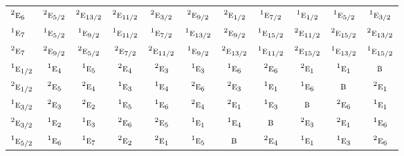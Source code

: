 \documentclass[10pt,a4paper]{article}
\numberwithin{equation}{section}
\newcommand{\irr}[1]{\text{\normalfont\scshape #1}}
\newcommand{\conjpair}[1]{{}^{#1}}
\begin{document}
{\begin{longtable}{@{}lcccccccccc@{}}
$\conjpair{2}\irr{e}_{6}$ & $\conjpair{2}\irr{e}_{5/2}$ & $\conjpair{2}\irr{e}_{13/2}$ & $\conjpair{2}\irr{e}_{11/2}$ & $\conjpair{2}\irr{e}_{3/2}$ & $\conjpair{2}\irr{e}_{9/2}$ & $\conjpair{2}\irr{e}_{1/2}$ & $\conjpair{1}\irr{e}_{7/2}$ & $\conjpair{1}\irr{e}_{1/2}$ & $\conjpair{1}\irr{e}_{5/2}$ & $\conjpair{1}\irr{e}_{3/2}$\\
$\conjpair{1}\irr{e}_{7}$ & $\conjpair{1}\irr{e}_{5/2}$ & $\conjpair{1}\irr{e}_{9/2}$ & $\conjpair{1}\irr{e}_{11/2}$ & $\conjpair{1}\irr{e}_{7/2}$ & $\conjpair{1}\irr{e}_{13/2}$ & $\conjpair{2}\irr{e}_{9/2}$ & $\conjpair{1}\irr{e}_{15/2}$ & $\conjpair{2}\irr{e}_{11/2}$ & $\conjpair{2}\irr{e}_{15/2}$ & $\conjpair{2}\irr{e}_{13/2}$\\
$\conjpair{2}\irr{e}_{7}$ & $\conjpair{2}\irr{e}_{9/2}$ & $\conjpair{2}\irr{e}_{5/2}$ & $\conjpair{2}\irr{e}_{7/2}$ & $\conjpair{2}\irr{e}_{11/2}$ & $\conjpair{1}\irr{e}_{9/2}$ & $\conjpair{2}\irr{e}_{13/2}$ & $\conjpair{1}\irr{e}_{11/2}$ & $\conjpair{2}\irr{e}_{15/2}$ & $\conjpair{1}\irr{e}_{13/2}$ & $\conjpair{1}\irr{e}_{15/2}$\\
$\conjpair{1}\irr{e}_{1/2}$ & $\conjpair{1}\irr{e}_{4}$ & $\conjpair{1}\irr{e}_{5}$ & $\conjpair{2}\irr{e}_{4}$ & $\conjpair{2}\irr{e}_{3}$ & $\conjpair{1}\irr{e}_{3}$ & $\conjpair{1}\irr{e}_{6}$ & $\conjpair{2}\irr{e}_{6}$ & $\conjpair{2}\irr{e}_{1}$ & $\conjpair{1}\irr{e}_{1}$ & $\irr{b}$\\
$\conjpair{2}\irr{e}_{1/2}$ & $\conjpair{2}\irr{e}_{5}$ & $\conjpair{2}\irr{e}_{4}$ & $\conjpair{1}\irr{e}_{3}$ & $\conjpair{1}\irr{e}_{4}$ & $\conjpair{2}\irr{e}_{6}$ & $\conjpair{2}\irr{e}_{3}$ & $\conjpair{1}\irr{e}_{1}$ & $\conjpair{1}\irr{e}_{6}$ & $\irr{b}$ & $\conjpair{2}\irr{e}_{1}$\\
$\conjpair{1}\irr{e}_{3/2}$ & $\conjpair{2}\irr{e}_{3}$ & $\conjpair{2}\irr{e}_{2}$ & $\conjpair{1}\irr{e}_{5}$ & $\conjpair{1}\irr{e}_{6}$ & $\conjpair{2}\irr{e}_{4}$ & $\conjpair{2}\irr{e}_{1}$ & $\conjpair{1}\irr{e}_{3}$ & $\irr{b}$ & $\conjpair{2}\irr{e}_{6}$ & $\conjpair{1}\irr{e}_{1}$\\
$\conjpair{2}\irr{e}_{3/2}$ & $\conjpair{1}\irr{e}_{2}$ & $\conjpair{1}\irr{e}_{3}$ & $\conjpair{2}\irr{e}_{6}$ & $\conjpair{2}\irr{e}_{5}$ & $\conjpair{1}\irr{e}_{1}$ & $\conjpair{1}\irr{e}_{4}$ & $\irr{b}$ & $\conjpair{2}\irr{e}_{3}$ & $\conjpair{2}\irr{e}_{1}$ & $\conjpair{1}\irr{e}_{6}$\\
$\conjpair{1}\irr{e}_{5/2}$ & $\conjpair{1}\irr{e}_{6}$ & $\conjpair{1}\irr{e}_{7}$ & $\conjpair{2}\irr{e}_{2}$ & $\conjpair{2}\irr{e}_{1}$ & $\conjpair{1}\irr{e}_{5}$ & $\irr{b}$ & $\conjpair{2}\irr{e}_{4}$ & $\conjpair{1}\irr{e}_{1}$ & $\conjpair{1}\irr{e}_{3}$ & $\conjpair{2}\irr{e}_{6}$\\

\end{longtable}}
\end{document}

